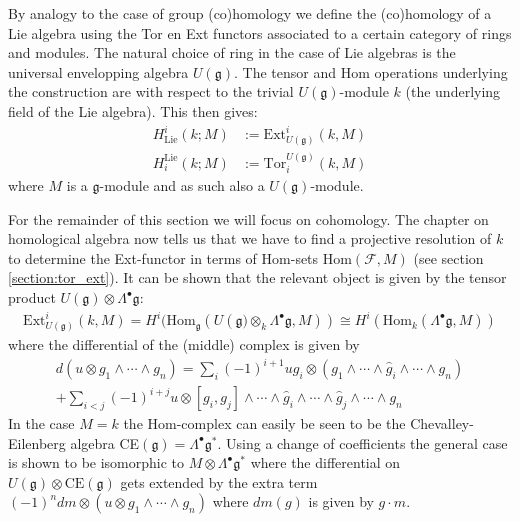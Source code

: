 	By analogy to the case of group (co)homology we define the (co)homology of a Lie algebra using the Tor en Ext functors associated to a certain category of rings and modules. The natural choice of ring in the case of Lie algebras is the universal envelopping algebra $U(\mathfrak{g})$. The tensor and Hom operations underlying the construction are with respect to the trivial $U(\mathfrak{g})$-module $k$ (the underlying field of the Lie algebra). This then gives:
	\begin{align}
		H^i_{\text{Lie}}(k;M) &:= \text{Ext}^i_{U(\mathfrak{g})}(k,M)\\
		H_i^{\text{Lie}}(k;M) &:= \text{Tor}_i^{U(\mathfrak{g})}(k,M)
	\end{align}
	where $M$ is a $\mathfrak{g}$-module and as such also a $U(\mathfrak{g})$-module.
	
	For the remainder of this section we will focus on cohomology. The chapter on homological algebra now tells us that we have to find a projective resolution of $k$ to determine the Ext-functor in terms of Hom-sets Hom$(\mathcal{F}, M)$ (see section \ref{section:tor_ext}). It can be shown that the relevant object is given by the tensor product $U(\mathfrak{g})\otimes\Lambda^\bullet\mathfrak{g}$:
	\begin{gather}
		\text{Ext}^i_{U(\mathfrak{g})}(k, M) = H^i(\text{Hom}_{\mathfrak{g}}(U(\mathfrak{g)}\otimes_k\Lambda^\bullet\mathfrak{g}, M)) \cong H^i(\text{Hom}_k(\Lambda^\bullet\mathfrak{g}, M))
	\end{gather}
	where the differential of the (middle) complex is given by
	\begin{gather}
		d(u\otimes g_1\wedge\cdots\wedge g_n) = \sum_i(-1)^{i+1}ug_i\otimes(g_1\wedge\cdots\wedge\hat{g}_i\wedge\cdots\wedge g_n)\\+ \sum_{i<j}(-1)^{i+j}u\otimes[g_i,g_j]\wedge\cdots\wedge\hat{g}_i\wedge\cdots\wedge\hat{g}_j\wedge\cdots\wedge g_n\nonumber
	\end{gather}
	In the case $M=k$ the Hom-complex can easily be seen to be the Chevalley-Eilenberg algebra CE$(\mathfrak{g})=\Lambda^\bullet\mathfrak{g}^*$. Using a change of coefficients the general case is shown to be isomorphic to $M\otimes\Lambda^\bullet\mathfrak{g}^*$ where the differential on $U(\mathfrak{g})\otimes\text{CE}(\mathfrak{g})$ gets extended by the extra term $(-1)^n dm\otimes (u\otimes g_1\wedge\cdots\wedge g_n)$ where $dm(g)$ is given by $g\cdot m$.


